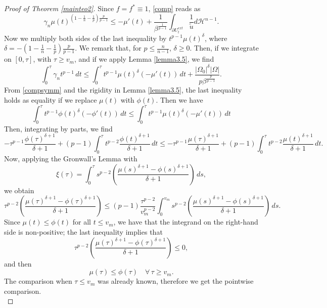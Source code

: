 \documentclass[12pt]{article}
\newcommand{\abs}[1]{{\left|#1\right|}}
\newcommand{\dH}{d\mathcal{H}^{n-1}}
\theoremstyle{definition}
\theoremstyle{plain}
\theoremstyle{definition}
\begin{document}
\begin{proof}[Proof of Theorem \ref{mainteo2}]
    Since $f=f^*\equiv1$, \eqref{comp} reads as
    \begin{equation}\label{20}
        \gamma_n\mu(t)^{\left(1-\frac{1}{n}-\frac{1}{p}\right)\frac{p}{p-1}}\leq -\mu'(t)+\frac{1}{\beta^\frac{1}{p-1}}\int_{\partial U_t^{ext}}\frac{1}{\tilde u} \dH.
    \end{equation}
    Now we multiply both sides of the last inequality by $t^{p-1}\mu(t)^\delta$, where $\delta=-\left(1-\frac{1}{n}-\frac{1}{p}\right)\frac{p}{p-1}$. We remark that, for $p\leq\frac{n}{n-1}$, $\delta\geq0$. Then, if we integrate on $[0,\tau]$, with $\tau\geq v_m$, and if we apply Lemma \ref{lemma3.5}, we find
    \begin{equation*}
        \int_0^\tau\gamma_n t^{p-1}\,dt\leq\int_0^\tau t^{p-1}\mu(t)^\delta(-\mu'(t))\,dt+\frac{\abs{\Omega_0}^{\delta}\abs{\Omega}}{p\beta^\frac{p}{p-1}}.
    \end{equation*}
    From \eqref{compsymm} and the rigidity in Lemma \ref{lemma3.5}, the last inequality holds as equality if we replace $\mu(t)$ with $\phi(t)$. Then we have
    \begin{equation*}
        \int_0^\tau t^{p-1}\phi(t)^\delta(-\phi'(t))\,dt\leq \int_0^\tau t^{p-1}\mu(t)^\delta(-\mu'(t))\,dt
    \end{equation*}
    Then, integrating by parts, we find
    \begin{equation*}
        -\tau^{p-1}\frac{\phi(\tau)^{\delta+1}}{\delta+1}+(p-1)\int_0^\tau t^{p-2}\frac{\phi(t)^{\delta+1}}{\delta+1}\,dt\leq -\tau^{p-1}\frac{\mu(\tau)^{\delta+1}}{\delta+1}+(p-1)\int_0^\tau t^{p-2}\frac{\mu(t)^{\delta+1}}{\delta+1}\,dt.
    \end{equation*}
    Now, applying the Gronwall's Lemma with
    \begin{equation*}
        \xi(\tau)=\int_0^\tau s^{p-2}\left(\frac{\mu(s)^{\delta+1}-\phi(s)^{\delta+1}}{\delta+1}\right)\,ds,
    \end{equation*}
    we obtain
    \begin{equation*}
        \tau^{p-2}\left(\frac{\mu(\tau)^{\delta+1}-\phi(\tau)^{\delta+1}}{\delta+1}\right)\leq (p-1)\frac{\tau^{p-2}}{v_m^{p-2}}\int_0^{v_m}s^{p-2}\left(\frac{\mu(s)^{\delta+1}-\phi(s)^{\delta+1}}{\delta+1}\right)\,ds.
    \end{equation*}
    Since $\mu(t)\leq\phi(t)$ for all $t\leq v_m$, we have that the integrand on the right-hand side is non-positive; the last inequality implies that
    \begin{equation*}
        \tau^{p-2}\left(\frac{\mu(\tau)^{\delta+1}-\phi(\tau)^{\delta+1}}{\delta+1}\right)\leq 0,
    \end{equation*}
    and then
    \begin{equation*}
        \mu(\tau)\leq\phi(\tau) \quad\forall\,\tau\geq v_m.
    \end{equation*}
    The comparison when $\tau\leq v_m$ was already known, therefore we get the pointwise comparison. \\
    

\end{proof}
\end{document}
